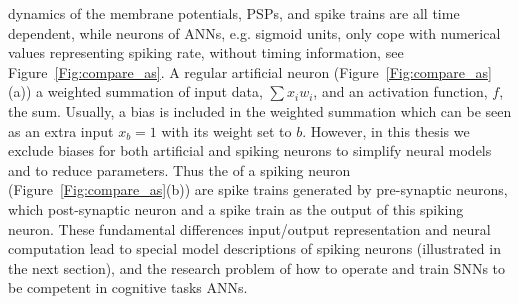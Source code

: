 \DIFdelbegin {}\DIFdelend \DIFaddbegin {}\DIFaddend dynamics of the membrane potentials, PSPs, and spike trains are all time dependent, while \DIFaddbegin {}\DIFaddend neurons of ANNs, e.g. sigmoid units, only cope with numerical values representing spiking rate, without timing information, see Figure~\ref{Fig:compare_as}.
A regular artificial neuron (Figure~\ref{Fig:compare_as}(a)) \DIFdelbegin {}\DIFdelend \DIFaddbegin {}\DIFaddend a weighted summation of input data, $\sum x_i w_i$, and an activation function, $f$, \DIFdelbegin {}\DIFdelend \DIFaddbegin {}\DIFaddend the sum. Usually, a bias is included in the weighted summation which can be seen as an extra input $x_b = 1$ with its weight set to $b$.
However, in this thesis we exclude biases for both artificial and spiking neurons to simplify \DIFaddbegin {}\DIFaddend neural models and to reduce \DIFaddbegin {}\DIFaddend parameters.
Thus the \DIFdelbegin {}\DIFdelend \DIFaddbegin {}\DIFaddend of a spiking neuron (Figure~\ref{Fig:compare_as}(b)) are spike trains generated by pre-synaptic neurons, which \DIFdelbegin {}\DIFdelend \DIFaddbegin {}\DIFaddend post-synaptic neuron and \DIFdelbegin {}\DIFdelend \DIFaddbegin {}\DIFaddend a spike train as the output of this spiking neuron.
These fundamental differences \DIFdelbegin {}\DIFdelend \DIFaddbegin {}\DIFaddend input/output representation and neural computation lead to special model descriptions of spiking neurons (illustrated in the next section), and \DIFdelbegin {}\DIFdelend \DIFaddbegin {}\DIFaddend the research problem of how to operate and train \DIFdelbegin {}\DIFdelend \DIFaddbegin {}\DIFaddend SNNs to be \DIFaddbegin {}\DIFaddend competent in cognitive tasks \DIFdelbegin {}\DIFdelend \DIFaddbegin {}\DIFaddend ANNs.

